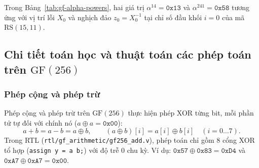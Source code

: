 \documentclass[11pt,a4paper]{report}
\begin{document}
Trong Bảng~\ref{tab:gf-alpha-powers}, hai giá trị $\alpha^{14} = \texttt{0x13}$ và $\alpha^{241} = \texttt{0x58}$ tương ứng với vị trí lỗi $X_0$ và nghịch đảo $z_0 = X_0^{-1}$ tại chỉ số đầu khối $i = 0$ của mã $\text{RS}(15,11)$.

\subsection{Chi tiết toán học và thuật toán các phép toán trên \texorpdfstring{$\text{GF}(256)$}{GF(256)}}

\subsubsection{Phép cộng và phép trừ}
Phép cộng và phép trừ trên $\text{GF}(256)$ thực hiện phép XOR từng bit, mỗi phần tử tự đối với chính nó ($a \oplus a = \texttt{0x00}$):
\begin{equation}
    a + b = a - b = a \oplus b, \qquad (a \oplus b)[i] = a[i] \oplus b[i] \quad (i = 0 \dots 7).
    \label{eq:gf-add-sub}
\end{equation}
Trong RTL (\texttt{rtl/gf\_arithmetic/gf256\_add.v}), phép toán chỉ gồm 8 cổng XOR tổ hợp (\texttt{assign y = a  b;}) với độ trễ $0$ chu kỳ. Ví dụ: $\texttt{0x57} \oplus \texttt{0x83} = \texttt{0xD4}$ và $\texttt{0xA7} \oplus \texttt{0xA7} = \texttt{0x00}$.
\end{document}
